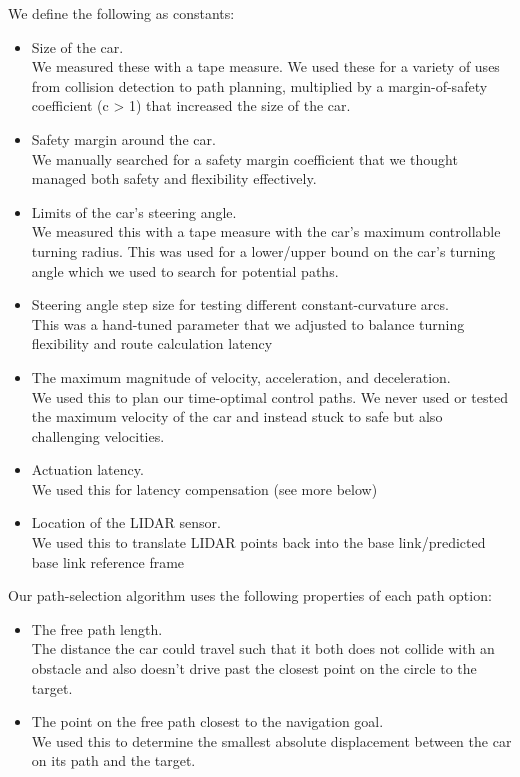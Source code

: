 \documentclass[11pt]{article}
\begin{document}
We define the following as constants:
\begin{itemize}
    \item Size of the car.
    \\ We measured these with a tape measure. We used these for a variety of uses from collision detection to path planning, multiplied by a margin-of-safety coefficient (c > 1) that increased the size of the car.
    \item Safety margin around the car.
    \\ We manually searched for a safety margin  coefficient that we thought managed both safety and flexibility effectively.  
    \item Limits of the car's steering angle.
    \\ We measured this with a tape measure with the car's maximum controllable turning radius. This was used for a lower/upper bound on the car's turning angle which we used to search for potential paths. 
    \item Steering angle step size for testing different constant-curvature arcs.
    \\ This was a hand-tuned parameter that we adjusted to balance turning flexibility and route calculation latency
    \item The maximum magnitude of velocity, acceleration, and deceleration.
    \\ We used this to plan our time-optimal control paths. We never used or tested the maximum velocity of the car and instead stuck to safe but also challenging velocities.  
    \item Actuation latency.
    \\ We used this for latency compensation (see more below)
    \item Location of the LIDAR sensor.
    \\ We used this to translate LIDAR points back into the base link/predicted base link reference frame
\end{itemize}

Our path-selection algorithm uses the following properties of each path option:
\begin{itemize}
    \item The free path length.
    \\The distance the car could travel such that it both does not collide with an obstacle and also doesn't drive past the closest point on the circle to the target. 
    \item The point on the free path closest to the navigation goal.
    \\We used this to determine the smallest absolute displacement between the car on its path and the target.
\end{itemize}
\end{document}

